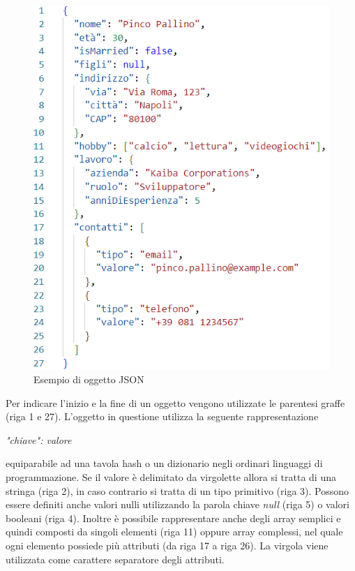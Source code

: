 \begin{figure}[H]
    \centering
    \includegraphics[keepaspectratio=true,scale=0.5]{Images/JSONExample.png}
    \caption{Esempio di oggetto JSON}
\end{figure}


Per indicare l'inizio e la fine di un oggetto vengono utilizzate le parentesi graffe (riga 1 e 27).
L'oggetto in questione utilizza la seguente rappresentazione
\begin{center}
   \emph{"chiave": valore}
\end{center}
 equiparabile ad una tavola hash o un dizionario negli ordinari linguaggi di programmazione.
 Se il valore è delimitato da virgolette allora si tratta di una stringa (riga 2), in caso contrario si tratta di un tipo primitivo (riga 3).
 Possono essere definiti anche valori nulli utilizzando la parola chiave \emph{null} (riga 5) o valori booleani (riga 4).
Inoltre è possibile rappresentare anche degli array semplici e quindi composti da singoli elementi (riga 11) oppure array complessi, nel quale ogni elemento possiede più attributi (da riga 17 a riga 26). La virgola viene utilizzata come carattere separatore degli attributi.


